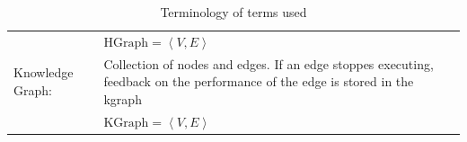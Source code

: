 \begin{table}[ht]
\begin{tabular}[t]{l p{10cm}}
        & $ \text{HGraph} = \left\langle V, E \right\rangle $\\
Knowledge Graph:& Collection of nodes and edges. If an edge stoppes executing, feedback on the performance of the edge is stored in the \ac{kgraph}\\
        & $ \text{KGraph} = \left\langle V, E \right\rangle $\\
\end{tabular}
\caption{Terminology of terms used}
\label{table:proposed_method_terminology}
\end{table}




